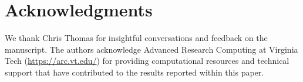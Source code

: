 \section*{Acknowledgments}

We thank Chris Thomas for insightful conversations and feedback on the manuscript.
The authors acknowledge Advanced Research Computing at Virginia Tech (\url{https://arc.vt.edu/}) for providing computational resources and technical support that have contributed to the results reported within this paper.

